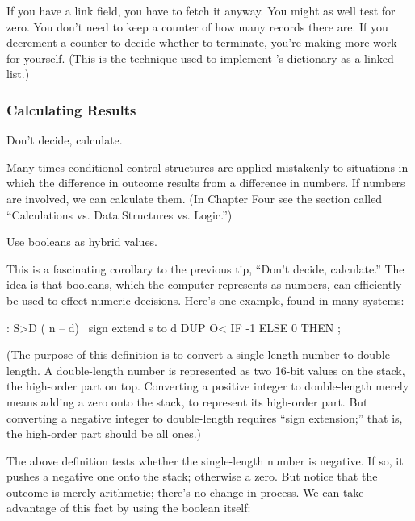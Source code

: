 If you have a link field, you have to fetch it anyway. You might as
well test for zero. You don't need to keep a counter of how many records
there are. If you decrement a counter to decide whether to terminate,
you're making more work for yourself. (This is the technique used to
implement \Forth{}'s dictionary as a linked list.)%
%
%
%
%

\subsubsection{Calculating Results}%
%
%

\begin{tip}
Don't decide, calculate.
\end{tip}
Many times conditional control structures are applied mistakenly to
situations in which the difference in outcome results from a difference in
numbers. If numbers are involved, we can calculate them. (In Chapter
Four see the section called ``Calculations vs. Data Structures vs. Logic.'')
%
\begin{tip}
Use booleans as hybrid values.
\end{tip}
This is a fascinating corollary to the previous tip, ``Don't decide,
calculate.'' The idea is that booleans, which the computer represents as
numbers, can efficiently be used to effect numeric decisions. Here's one
example, found in many \Forth{} systems:

\begin{Code}
: S>D  ( n -- d)  \ sign extend s to d
     DUP O<  IF -1  ELSE  0 THEN ;
\end{Code}
(The purpose of this definition is to convert a single-length number to
double-length. A double-length number is represented as two 16-bit
values on the stack, the high-order part on top. Converting a positive
integer to double-length merely means adding a zero onto the stack, to
represent its high-order part. But converting a negative integer to
double-length requires ``sign extension;'' that is, the high-order part
should be all ones.)

The above definition tests whether the single-length number is negative.
If so, it pushes a negative one onto the stack; otherwise a zero.  But
notice that the outcome is merely arithmetic; there's no change in
process. We can take advantage of this fact by using the boolean itself:

